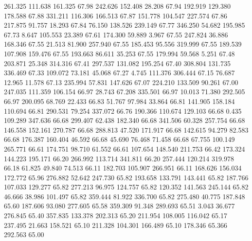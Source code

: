  261.325  111.638  161.325        67.98
 242.626  152.408   28.208        67.94
 192.919  129.380  178.588        67.88
 331.211  116.306  166.513        67.87
 151.778  104.547  227.574        67.86
 217.875   91.757   18.293        67.84
  76.150  138.526  239.149        67.77
 346.250   54.682  195.985        67.73
   8.647  105.553   23.389        67.61
 174.300   59.889    3.967        67.55
 247.824   36.886  168.346        67.55
  21.513   81.900  257.940        67.55
 185.453   95.556  319.999        67.55
 189.539  107.908  159.476        67.55
 193.663   86.611   35.253        67.55
 179.994   59.568    5.251        67.48
 203.871   25.348  314.316        67.41
 297.537  131.082  195.254        67.40
 308.804  131.735  336.469        67.33
 109.072   73.181   45.068        67.27
   4.745  111.376  306.444        67.15
  76.687   12.965   11.578        67.13
 235.994   57.831  147.626        67.07
 224.210  133.509   90.261        67.00
 247.035  111.359  106.154        66.97
  28.743   67.208  335.501        66.97
  10.013   71.380  292.505        66.97
 200.095   68.769   22.433        66.83
  51.767   97.984   33.864        66.81
 141.905  158.184  110.694        66.81
 290.531   79.254  337.072        66.76
 190.366  110.674  129.103        66.68
   0.435  109.289  347.636        66.68
 299.407   62.438  182.340        66.68
 341.506   60.328  257.754        66.68
 146.558  152.161  270.787        66.68
 288.813   47.520  171.917        66.68
 142.615   94.279   82.583        66.68
 176.387  160.404   46.592        66.68
  45.690   76.468   71.458        66.68
  67.755  100.149  265.771        66.61
 174.751   98.710   61.552        66.61
 107.654  148.540  211.753        66.42
 173.324  144.223  195.171        66.20
 266.992  113.714  341.811        66.20
 257.444  120.214  319.978        66.18
  61.825   49.840   74.513        66.11
 182.703  105.907  266.951        66.11
 168.626  156.034  172.772        65.96
 276.882   52.642  247.730        65.82
 193.658  133.791  143.441        65.82
 187.766  107.033  129.277        65.82
 277.213   96.975  124.757        65.82
 120.352  141.563  245.144        65.82
  46.666   38.986  101.497        65.82
 359.444   81.922  336.700        65.82
 275.480   40.775  187.848        65.60
 187.606   93.080  277.605        65.58
 359.309   91.348  289.693        65.51
   3.043   36.677  276.845        65.40
 357.835  133.378  202.313        65.20
 211.954  108.005  116.042        65.17
 237.495   21.663  158.521        65.10
 211.328  104.301  166.489        65.10
 178.346   65.366  292.563        65.00
